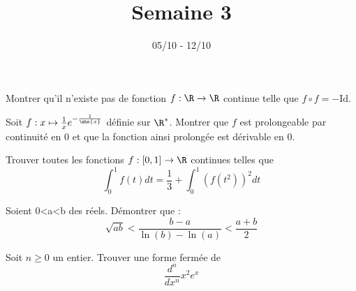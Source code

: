 \documentclass[11pt,a4paper]{article}
\begin{document}
\title{Semaine 3}
\author{}
\date{05/10 - 12/10 }

\maketitle


\begin{exercise}
Montrer qu'il n'existe pas de fonction $f:\R\to \R$ continue telle que
$f\circ f=-\text{Id}$.
\end{exercise}

\begin{exercise}
Soit $f:x\mapsto \frac{1}{x}e^{-\frac{1}{\abs{x}}}$ définie sur $\R^*$.
Montrer que $f$ est prolongeable par continuité en $0$ et que la fonction ainsi prolongée est dérivable en $0$.
\end{exercise}

\begin{exercise}
Trouver toutes les fonctions $f:[0,1]\to \R$ continues telles que 
$$\int_0^1 f(t)dt=\frac{1}{3}+\int_0^1(f(t^2))^2dt$$
\end{exercise}

\begin{exercise}
Soient 0<a<b des réels. Démontrer que :
\[\sqrt{ab}<\frac{b-a}{\ln(b)-\ln(a)}<\frac{a+b}2\]
\end{exercise}

\begin{exercise}
Soit $n\ge 0$ un entier. Trouver une forme fermée de 
\[\frac{d^n}{dx^n}x^2e^x\]
\end{exercise}
\end{document}
